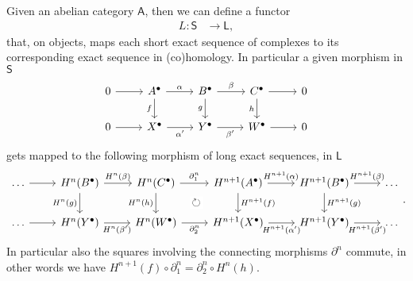 \begin{prop}
	Given an abelian category $\mathsf{A}$, then we can define a functor
	\begin{align}
		L: \mathsf{S} &\to \mathsf{L}
	,\end{align} 
	that, on objects, maps each short exact sequence of complexes to its corresponding exact
	sequence in (co)homology.
	In particular a given morphism in $\mathsf{S}$
	\begin{equation}
	\begin{tikzcd}
		0 \arrow[r, "", rightarrow] &
		A^\bullet \arrow[r, "\alpha", rightarrow] \arrow[d, "f"', rightarrow] &
		B^\bullet \arrow[r, "\beta", rightarrow] \arrow[d, "g"', rightarrow] &
		C^\bullet \arrow[r, "", rightarrow] \arrow[d, "h"', rightarrow] &
		0 \\
		0 \arrow[r, "", rightarrow] &
		X^\bullet \arrow[r, "\alpha'"', rightarrow] &
		Y^\bullet \arrow[r, "\beta'"', rightarrow] &
		W^\bullet \arrow[r, "", rightarrow] &
		0 
	\end{tikzcd}
	\end{equation} 
	gets mapped to the following morphism of long exact sequences, in $\mathsf{L}$ 
	\begin{equation*}
	\begin{tikzcd}[column sep = 2.4em]
		\ldots \arrow[r, "", rightarrow] &
		H^n(B^\bullet) \arrow[r, "H^n(\beta)", rightarrow] \arrow[d, "H^n(g)"', rightarrow] &
		H^n(C^\bullet) \arrow[r, "\partial_1^n", rightarrow] \arrow[d, "H^n(h)"', rightarrow] 
		\arrow[rd, "\circlearrowright" description, phantom, rightarrow] &
		H^{n+1}(A^\bullet) \arrow[r, "H^{n+1}(\alpha)", rightarrow] \arrow[d, "H^{n+1}(f)", rightarrow] &
		H^{n+1}(B^\bullet) \arrow[r, "H^{n+1}(\beta)", rightarrow] \arrow[d, "H^{n+1}(g)", rightarrow] &
		\ldots \\
		\ldots \arrow[r, "", rightarrow] &
		H^n(Y^\bullet) \arrow[r, "H^n(\beta')"', rightarrow] &
		H^n(W^\bullet) \arrow[r, "\partial_2^n"', rightarrow] &
		H^{n+1}(X^\bullet) \arrow[r, "H^{n+1}(\alpha')"', rightarrow] &
		H^{n+1}(Y^\bullet) \arrow[r, "H^{n+1}(\beta')"', rightarrow] &
		\ldots 
	\end{tikzcd}
	.\end{equation*} 
	In particular also the squares involving the connecting morphisms $\partial^n$ commute,
	in other words we have $H^{n+1}(f) \circ \partial_1^n = \partial_2^n \circ H^n(h)$.
\end{prop} 

